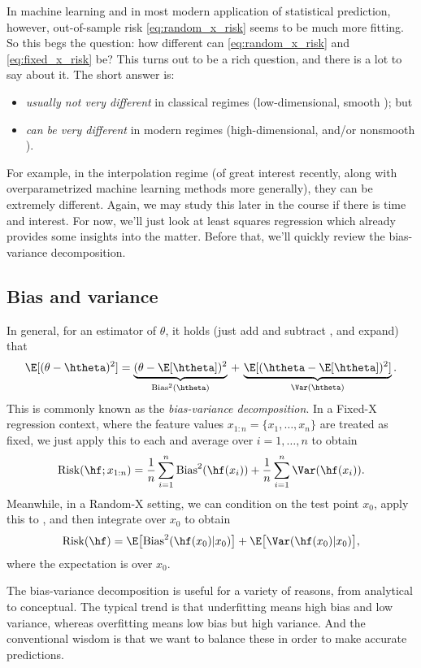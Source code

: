 \documentclass{article}
\begin{document}
In machine learning and in most modern application of statistical prediction,
however, out-of-sample risk \eqref{eq:random_x_risk} seems to be much more 
fitting. So this begs the question: how different can \eqref{eq:random_x_risk}  
and \eqref{eq:fixed_x_risk} be? This turns out to be a rich question, and there
is a lot to say about it. The short answer is:
\begin{itemize}
\item \emph{usually not very different} in classical regimes (low-dimensional,
  smooth ); but  
\item \emph{can be very different} in modern regimes (high-dimensional, and/or
  nonsmooth ).     
\end{itemize}
For example, in the interpolation regime (of great interest recently, along with
overparametrized machine learning methods more generally), they can be extremely
different. Again, we may study this later in the course if there is time and 
interest. For now, we'll just look at least squares regression which already
provides some insights into the matter. Before that, we'll quickly review the 
bias-variance decomposition. 

\subsection{Bias and variance} 

\def\Bias{\mathrm{Bias}}

In general, for an estimator \smash{$\htheta$} of $\theta$, it holds (just add
and subtract \smash{$\E[\htheta]$}, and expand) that
\[
\E[(\theta - \htheta)^2] = 
\underbrace{(\theta - \E[\htheta])^2}_{\Bias^2(\htheta)} \,+\,
\underbrace{\E[(\htheta - \E[\htheta])^2]}_{\Var(\htheta)}. 
\]
This is commonly known as the \emph{bias-variance decomposition}. In a Fixed-X
regression context, where the feature values $x_{1:n} = \{x_1,\dots,x_n\}$ are
treated as fixed, we just apply this to each  and
average over $i=1,\dots,n$ to obtain 
\[
\Risk(\hf; x_{1:n}) = \frac{1}{n} \sum_{i=1}^n \Bias^2(\hf(x_i)) + \frac{1}{n}
\sum_{i=1}^n \Var(\hf(x_i)). 
\] 
Meanwhile, in a Random-X setting, we can condition on the test point $x_0$,
apply this to , and then integrate over $x_0$ to
obtain   
\[
\Risk(\hf) = \E\big[\Bias^2(\hf(x_0) | x_0)\big] + \E\big[ \Var(\hf(x_0) | x_0)
\big],
\] 
where the expectation is over $x_0$. 

The bias-variance decomposition is useful for a variety of reasons, from
analytical to conceptual. The typical trend is that underfitting means high bias
and low variance, whereas overfitting means low bias but high variance. And the
conventional wisdom is that we want to balance these in order to make accurate
predictions.
\end{document}
